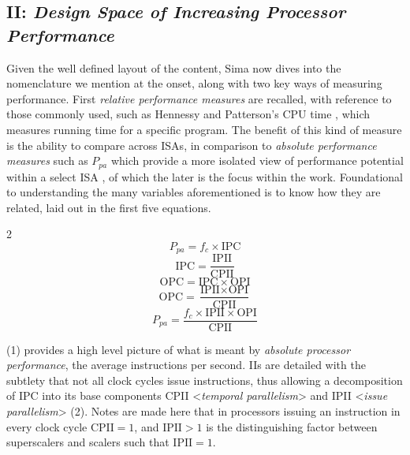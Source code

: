 \documentclass{article}
\begin{document}
\subsection{\textbf{II}: \emph{Design Space of Increasing Processor Performance}}
Given the well defined layout of the content, Sima now dives into the nomenclature we mention at the onset, along with two key ways of measuring performance.
First \emph{relative performance measures} are recalled, with reference to those commonly used, such as Hennessy and Patterson's CPU time \cite{Hennessy}, which measures running time for a specific program.
The benefit of this kind of measure is the ability to compare across ISAs, in comparison to \emph{absolute performance measures} such as \(P_{pa}\) which provide a more isolated view of performance potential within a select ISA \cite{Sima}, of which the later is the focus within the work.
Foundational to understanding the many variables aforementioned is to know how they are related, laid out in the first five equations.
\begin{multicols}{2}
\begin{equation}
    P_{pa} = f_{c} \times \text{IPC}
\end{equation}
\begin{equation}
    \text{IPC} = \frac{\text{IPII}}{\text{CPII}}
\end{equation}
\begin{equation}
    \text{OPC} = \text{IPC} \times \text{OPI}
\end{equation}
\begin{equation}
    \text{OPC} = \frac{\text{IPII} \times \text{OPI}}{\text{CPII}}
\end{equation}
\begin{equation}
    P_{pa} = \frac{f_{c} \times \text{IPII} \times \text{OPI}}{\text{CPII}}
\end{equation}
\end{multicols}

(1) provides a high level picture of what is meant by \emph{absolute processor performance}, the average instructions per second.
IIs are detailed with the subtlety that not all clock cycles issue instructions, thus allowing a decomposition of IPC into its base components CPII <\emph{temporal parallelism}> and IPII <\emph{issue parallelism}> (2).
Notes are made here that in processors issuing an instruction in every clock cycle $\text{CPII} = 1$, and $\text{IPII} > 1$ is the distinguishing factor between superscalers and scalers such that $\text{IPII} = 1$.
\end{document}
